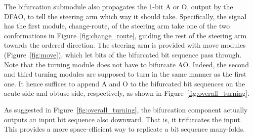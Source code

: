 The bifurcation submodule also propagates the 1-bit A or O, output by the DFAO, to tell the steering arm which way it should take.
Specifically, the signal has the first module, change-route, of the steering arm take one of the two conformations in Figure~\ref{fig:change_route}, guiding the rest of the steering arm towards the ordered direction.
The steering arm is provided with move modules (Figure~\ref{fig:move}), which let bits of the bifurcated bit sequence pass through.  
Note that the turning module does not have to bifurcate AO.
Indeed, the second and third turning modules are supposed to turn in the same manner as the first one.
It hence suffices to append A and O to the bifurcated bit sequences on the acute side and obtuse side, respectively, as shown in Figure~\ref{fig:overall_turning}.

\begin{remark}
As suggested in Figure~\ref{fig:overall_turning}, the bifurcation component actually outputs an input bit sequence also downward.
That is, it trifurcates the input.
This provides a more space-efficient way to replicate a bit sequence many-folds.
\end{remark}

